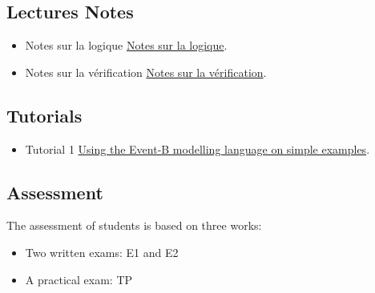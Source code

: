 \documentclass[ 12pt]{article}
\begin{document}
  \subsection{Lectures Notes}

  \begin{itemize}
  \item[]   Notes sur la logique
    \href{http://mery54.github.io/teaching/movex/lecturesnotes/preprint-chapterlogique.pdf}{Notes sur la logique}.

     \item[]   Notes sur la vérification
    \href{http://mery54.github.io/teaching/movex/lecturesnotes/preprint-chapterverification.pdf}{Notes sur la vérification}.

  \end{itemize}


  

\subsection{Tutorials}

  \begin{itemize}
  \item[]   Tutorial 1
    \href{http://mery54.github.io/teaching/movexlecturesnotes/movex1-td1.pdf}{Using
      the Event-B modelling language on simple examples}.

  \end{itemize}

  
  
  \subsection{Assessment}
\label{sec:project}

The assessment  of students is based on three works:
\begin{itemize}
\item Two  written  exams: E1 and E2
\item  A practical exam: TP
 \end{itemize}





\end{document}
